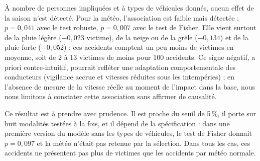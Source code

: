\documentclass[11pt,a4paper]{article}
\begin{document}
À nombre de personnes impliquées et à types de véhicules donnés, aucun effet de la saison n'est détecté. Pour la météo, l'association est faible mais détectée : $p = 0{,}041$ avec le test robuste, $p = 0{,}007$ avec le test de Fisher. Elle vient surtout de la pluie légère ($-0{,}023$ victime), de la neige ou de la grêle ($-0{,}134$) et de la pluie forte ($-0{,}052$) : ces accidents comptent un peu moins de victimes en moyenne, soit de 2 à 13 victimes de moins pour 100 accidents. Ce signe négatif, a priori contre-intuitif, pourrait refléter une adaptation comportementale des conducteurs (vigilance accrue et vitesses réduites sous les intempéries) ; en l'absence de mesure de la vitesse réelle au moment de l'impact dans la base, nous nous limitons à constater cette association sans affirmer de causalité.

Ce résultat est à prendre avec prudence. Il est proche du seuil de 5\,\%, il porte sur huit modalités testées à la fois, et il dépend de la spécification : dans une première version du modèle sans les types de véhicules, le test de Fisher donnait $p = 0{,}097$ et la météo n'était pas retenue par la sélection. Dans tous les cas, ces accidents ne présentent pas plus de victimes que les accidents par météo normale.
\end{document}
